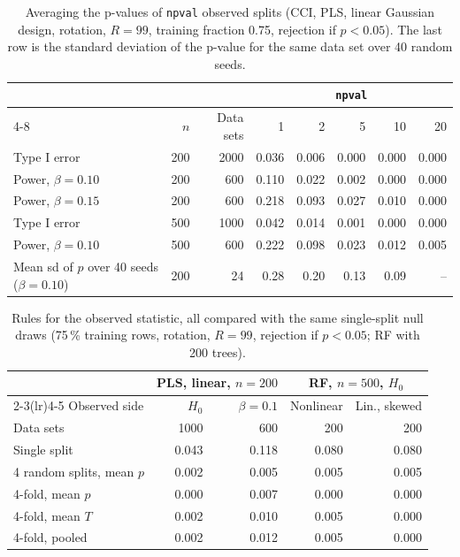 \documentclass[10pt,leqno]{amsart}
\newcommand{\fn}[1]{\texttt{#1}}            %
\begin{document}
\begin{table}[H]
\caption{Averaging the p-values of \fn{npval} observed splits (CCI, PLS, linear Gaussian design, rotation, $R=99$, training fraction 0.75, rejection if $p<0.05$). The last row is the standard deviation of the p-value for the same data set over 40 random seeds.}
\label{tab:npval}
\footnotesize
\setlength{\tabcolsep}{4pt}
\begin{tabular}{lrrrrrrr}
\toprule
 & & & \multicolumn{5}{c}{\fn{npval}} \\
\cmidrule(lr){4-8}
 & $n$ & Data sets & 1 & 2 & 5 & 10 & 20 \\
\midrule
Type I error & 200 & 2000 & 0.036 & 0.006 & 0.000 & 0.000 & 0.000 \\
Power, $\beta=0.10$ & 200 & 600 & 0.110 & 0.022 & 0.002 & 0.000 & 0.000 \\
Power, $\beta=0.15$ & 200 & 600 & 0.218 & 0.093 & 0.027 & 0.010 & 0.000 \\
Type I error & 500 & 1000 & 0.042 & 0.014 & 0.001 & 0.000 & 0.000 \\
Power, $\beta=0.10$ & 500 & 600 & 0.222 & 0.098 & 0.023 & 0.012 & 0.005 \\
\addlinespace
Mean sd of $p$ over 40 seeds ($\beta=0.10$) & 200 & 24 & 0.28 & 0.20 & 0.13 & 0.09 & -- \\
\bottomrule
\end{tabular}
\end{table}

\begin{table}[H]
\caption{Rules for the observed statistic, all compared with the same single-split null draws (75\,\% training rows, rotation, $R=99$, rejection if $p<0.05$; RF with 200 trees).}
\label{tab:crossfit4}
\footnotesize
\setlength{\tabcolsep}{4pt}
\begin{tabular}{lrrrr}
\toprule
 & \multicolumn{2}{c}{PLS, linear, $n=200$} & \multicolumn{2}{c}{RF, $n=500$, $H_0$} \\
\cmidrule(lr){2-3}\cmidrule(lr){4-5}
Observed side & $H_0$ & $\beta=0.1$ & Nonlinear & Lin., skewed \\
Data sets & 1000 & 600 & 200 & 200 \\
\midrule
Single split & 0.043 & 0.118 & 0.080 & 0.080 \\
4 random splits, mean $p$ & 0.002 & 0.005 & 0.005 & 0.005 \\
4-fold, mean $p$ & 0.000 & 0.007 & 0.000 & 0.000 \\
4-fold, mean $T$ & 0.002 & 0.010 & 0.005 & 0.000 \\
4-fold, pooled & 0.002 & 0.012 & 0.005 & 0.000 \\
\bottomrule
\end{tabular}
\end{table}
\end{document}
